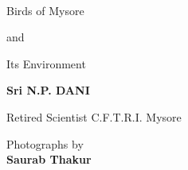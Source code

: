 ~\phantom{a}
\vfill

\thispagestyle{empty}

\begin{center}
{\Huge Birds of Mysore}\relax

\bigskip
{\Huge and}\relax

\smallskip
\bigskip
{\Huge Its Environment}\relax
\end{center}

\vfill

\begin{center}
{\bf Sri N.P. DANI}

\smallskip
{Retired Scientist C.F.T.R.I. Mysore}
\bigskip 

Photographs by\\
{\bf Saurab Thakur}

\end{center}
\newpage

 
